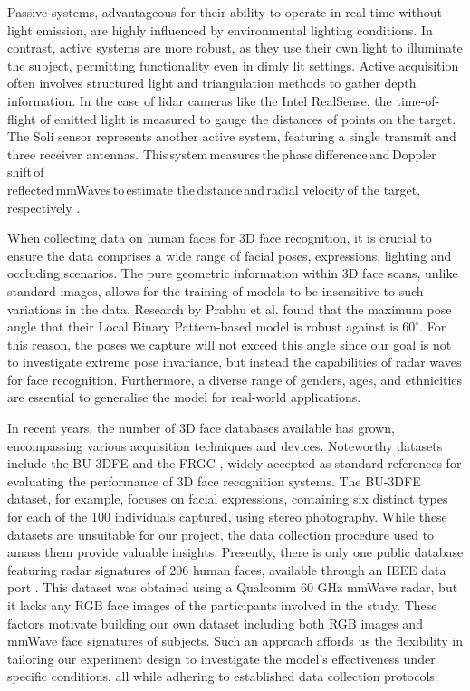 \documentclass{interim}
\begin{document}
Passive systems, advantageous for their ability to operate in real-time without light emission, are highly influenced by environmental lighting conditions. In contrast, active systems are more robust, as they use their own light to illuminate the subject, permitting functionality even in dimly lit settings. Active acquisition often involves structured light and triangulation methods to gather depth information. In the case of lidar cameras like the Intel RealSense, the time-of-flight of emitted light is measured to gauge the distances of points on the target. The Soli sensor represents another active system, featuring a single transmit and three receiver antennas. This\,system\,measures\,the\,phase\,difference\,and\,Doppler\,shift\,of\\reflected\,mmWaves\,to\,estimate the\,distance\,and\,radial velocity\,of the target,\,respectively \cite{lien2016soli}. 

When collecting data on human faces for 3D face recognition, it is crucial to ensure the data comprises a wide range of facial poses, expressions, lighting and occluding scenarios. The pure geometric information within 3D face scans, unlike standard images, allows for the training of models to be insensitive to such variations in the data. Research by Prabhu et al. \cite{prabhu2011unconstrained} found that the maximum pose angle that their Local Binary Pattern-based model is robust against is $60^\circ$. For this reason, the poses we capture will not exceed this angle since our goal is not to investigate extreme pose invariance, but instead the capabilities of radar waves for face recognition. Furthermore, a diverse range of genders, ages, and ethnicities are essential to generalise the model for real-world applications.

In recent years, the number of 3D face databases available has grown, encompassing various acquisition techniques and devices. Noteworthy datasets include the BU-3DFE \cite{yin20063d} and the FRGC \cite{phillips2005overview}, widely accepted as standard references for evaluating the performance of 3D face recognition systems. The BU-3DFE dataset, for example, focuses on facial expressions, containing six distinct types for each of the 100 individuals captured, using stereo photography. While these datasets are unsuitable for our project, the data collection procedure used to amass them provide valuable insights. Presently, there is only one public database featuring radar signatures of 206 human faces, available through an IEEE data port \cite{mmwavefacedata}. This dataset was obtained using a Qualcomm 60 GHz mmWave radar, but it lacks any RGB face images of the participants involved in the study. These factors motivate building our own dataset including both RGB images and mmWave face signatures of subjects. Such an approach affords us the flexibility in tailoring our experiment design to investigate the model's effectiveness under specific conditions, all while adhering to established data collection protocols.
\end{document}
